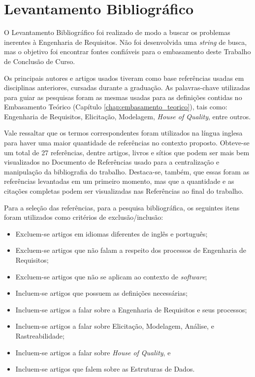 \section{Levantamento Bibliográfico}

\label{sec:levantamento_bibliografico}

O Levantamento Bibliográfico foi realizado de modo a buscar os problemas inerentes à Engenharia de Requisitos. Não foi desenvolvida uma \textit{string} de busca, mas o objetivo foi encontrar fontes confiáveis para o embasamento deste Trabalho de Conclusão de Curso.

Os principais autores e artigos usados tiveram como base referências usadas em disciplinas anteriores, cursadas durante a graduação. As palavras-chave utilizadas para guiar as pesquisas foram as mesmas usadas para as definições contidas no Embasamento Teórico (Capítulo \ref{chap:embasamento_teorico}), tais como: Engenharia de Requisitos, Elicitação, Modelagem, \textit{House of Quality}, entre outros.

Vale ressaltar que os termos correspondentes foram utilizados na língua inglesa para haver uma maior quantidade de referências no contexto proposto. Obteve-se um total de 27 referências, dentre artigos, livros e sítios que podem ser mais bem visualizados no Documento de Referências \cite{referencias_iflow} usado para a centralização e manipulação da bibliografia do trabalho. Destaca-se, também, que essas foram as referências levantadas em um primeiro momento, mas que a quantidade e as citações completas podem ser visualizadas nas Referências ao final do trabalho.

Para a seleção das referências, para a pesquisa bibliográfica, os seguintes itens foram utilizados como critérios de exclusão/inclusão:

\begin{itemize}
    \item Excluem-se artigos em idiomas diferentes de inglês e português;
    \item Excluem-se artigos que não falam a respeito dos processos de Engenharia de Requisitos;
    \item Excluem-se artigos que não se aplicam ao contexto de \textit{software};
    \item Incluem-se artigos que possuem as definições necessárias;
    \item Incluem-se artigos a falar sobre a Engenharia de Requisitos e seus processos;
    \item Incluem-se artigos a falar sobre Elicitação, Modelagem, Análise, e Rastreabilidade;
    \item Incluem-se artigos a falar sobre \textit{House of Quality}, e
    \item Incluem-se artigos que falem sobre as Estruturas de Dados.
\end{itemize}

